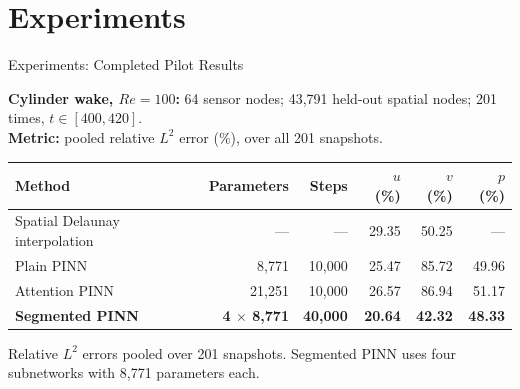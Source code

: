 \documentclass[12pt]{beamer}
\begin{document}

\section{Experiments}



\begin{frame}{Experiments: Completed Pilot Results}

\small

\textbf{Cylinder wake, $Re=100$:} 64 sensor nodes; 43,791 held-out spatial nodes; 201 times, $t\in[400,420]$.\\

\textbf{Metric:} pooled relative $L^2$ error (\%), over all 201 snapshots.

\vspace{0.30cm}

\centering

\renewcommand{\arraystretch}{1.32}

\begin{table}
\centering
\small
\renewcommand{\arraystretch}{1.3}

\begin{tabular}{lrrrrr}
\toprule
\textbf{Method}
& \textbf{Parameters}
& \textbf{Steps}
& \textbf{$u$ (\%)}
& \textbf{$v$ (\%)}
& \textbf{$p$ (\%)} \\
\midrule

Spatial Delaunay interpolation
& ---
& ---
& 29.35
& 50.25
& --- \\

Plain PINN
& 8,771
& 10,000
& 25.47
& 85.72
& 49.96 \\

Attention PINN
& 21,251
& 10,000
& 26.57
& 86.94
& 51.17 \\

\rowcolor{mint}
\textbf{Segmented PINN}
& \textbf{4 $\times$ 8,771}
& \textbf{40,000}
& \textbf{20.64}
& \textbf{42.32}
& \textbf{48.33} \\

\bottomrule
\end{tabular}

\vspace{0.15cm}
{\scriptsize
Relative $L^2$ errors pooled over 201 snapshots.
Segmented PINN uses four subnetworks with 8,771 parameters each.
}
\end{table}


\end{frame}
\end{document}

